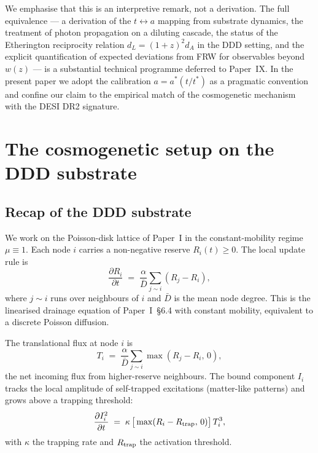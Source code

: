 \documentclass[11pt,a4paper]{article}
\begin{document}
We emphasise that this is an interpretive remark, not a derivation.
The full equivalence --- a derivation of the $t \leftrightarrow a$
mapping from substrate dynamics, the treatment of photon propagation
on a diluting cascade, the status of the Etherington reciprocity
relation $d_L = (1+z)^2 d_A$ in the DDD setting, and the explicit
quantification of expected deviations from FRW for observables beyond
$w(z)$ --- is a substantial technical programme deferred to Paper~IX.
In the present paper we adopt the calibration $a = a^\ast(t/t^\ast)$
as a pragmatic convention and confine our claim to the empirical match
of the cosmogenetic mechanism with the DESI DR2 signature.

\FloatBarrier
\section{The cosmogenetic setup on the DDD substrate}
\label{sec:setup}

\subsection{Recap of the DDD substrate}

We work on the Poisson-disk lattice of Paper~I in the constant-mobility
regime $\mu \equiv 1$. Each node $i$ carries a non-negative reserve
$R_i(t) \geq 0$. The local update rule is
\begin{equation}
\frac{\partial R_i}{\partial t} \;=\; \frac{\alpha}{\bar D}
\sum_{j \sim i} (R_j - R_i),
\label{eq:rule}
\end{equation}
where $j \sim i$ runs over neighbours of $i$ and $\bar D$ is the mean
node degree. This is the linearised drainage equation of
Paper~I~\S6.4 with constant mobility, equivalent to a discrete Poisson
diffusion.

The translational flux at node $i$ is
\begin{equation}
T_i \;=\; \frac{\alpha}{\bar D}
\sum_{j \sim i} \max(R_j - R_i,\,0),
\label{eq:T-def}
\end{equation}
the net incoming flux from higher-reserve neighbours. The bound
component $I_i$ tracks the local amplitude of self-trapped excitations
(matter-like patterns) and grows above a trapping threshold:
\begin{equation}
\frac{\partial I_i^2}{\partial t} \;=\;
\kappa\,\big[\max(R_i - R_{\rm trap},\,0)\big]\, T_i^3,
\label{eq:trapping}
\end{equation}
with $\kappa$ the trapping rate and $R_{\rm trap}$ the activation
threshold.
\end{document}
